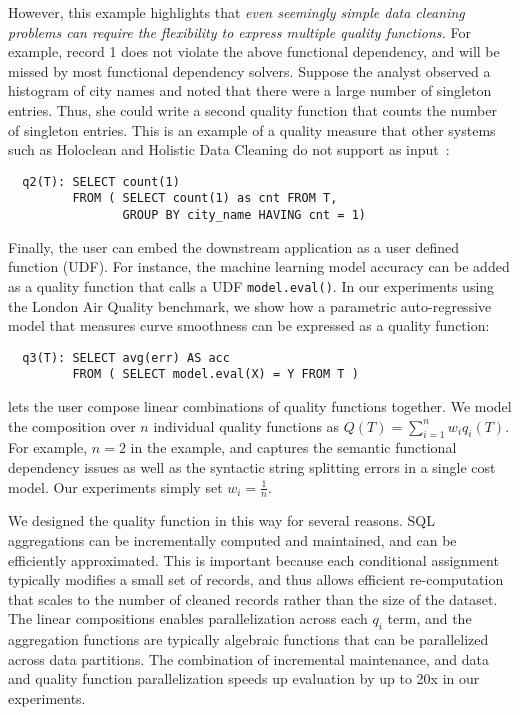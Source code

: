 However, this example highlights that \emph{even seemingly simple data cleaning problems can require the flexibility to express multiple quality functions.}   For example, record 1 does not violate the above functional dependency, and will be missed by most functional dependency solvers.  Suppose the analyst observed a histogram of city names and noted that there were a large number of singleton entries. Thus, she could write a second quality function that counts the number of singleton entries.  This is an example of a quality measure that other systems such as Holoclean and Holistic Data Cleaning do not support as input~\cite{rekatsinas2017holoclean,DBLP:conf/sigmod/ChuIKW16}:
{\small
\begin{lstlisting}
  q2(T): SELECT count(1)
         FROM ( SELECT count(1) as cnt FROM T,
                GROUP BY city_name HAVING cnt = 1)
\end{lstlisting}}
Finally, the user can embed the downstream application as a user defined function (UDF).  For instance, the machine learning model accuracy can be added as a quality function that calls a UDF \texttt{model.eval()}.  In our experiments using the London Air Quality benchmark, we show how a parametric auto-regressive model that measures curve smoothness can be expressed as a quality function:
{\small\begin{lstlisting}
  q3(T): SELECT avg(err) AS acc
         FROM ( SELECT model.eval(X) = Y FROM T )
\end{lstlisting}}
\noindent \sys lets the user compose linear combinations of quality functions together. We model the composition over $n$ individual quality functions as $Q(T) = \sum_{i=1}^n w_iq_i(T)$.  For example, $n=2$ in the example, and captures the semantic functional dependency issues as well as the syntactic string splitting errors in a single cost model.  Our experiments simply set $w_i=\frac{1}{n}$.

We designed the quality function in this way for several reasons.  SQL aggregations can be incrementally computed and maintained, and can be efficiently approximated.  This is important because each conditional assignment typically modifies a small set of records, and thus allows efficient re-computation that scales to the number of cleaned records rather than the size of the dataset.  The linear compositions enables parallelization across each $q_i$ term, and the aggregation functions are typically algebraic functions that can be parallelized across data partitions.  The combination of incremental maintenance, and data and quality function parallelization speeds up evaluation by up to 20x in our experiments.

